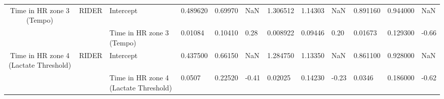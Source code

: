 \begin{tabular}{c}
Time in HR zone 3 (Tempo) & RIDER & Intercept &  0.489620 &  0.69970 &   NaN &  1.306512 &  1.14303 &   NaN &   0.891160 &  0.944000 &   NaN \\
                                      &       & Time in HR zone 3 (Tempo) &   0.01084 &  0.10410 &  0.28 &  0.008922 &  0.09446 &  0.20 &    0.01673 &  0.129300 & -0.66 \\
Time in HR zone 4 (Lactate Threshold) & RIDER & Intercept &  0.437500 &  0.66150 &   NaN &  1.284750 &  1.13350 &   NaN &   0.861100 &  0.928000 &   NaN \\
                                      &       & Time in HR zone 4 (Lactate Threshold) &    0.0507 &  0.22520 & -0.41 &   0.02025 &  0.14230 & -0.23 &     0.0346 &  0.186000 & -0.62 \\
\bottomrule
\end{tabular}
